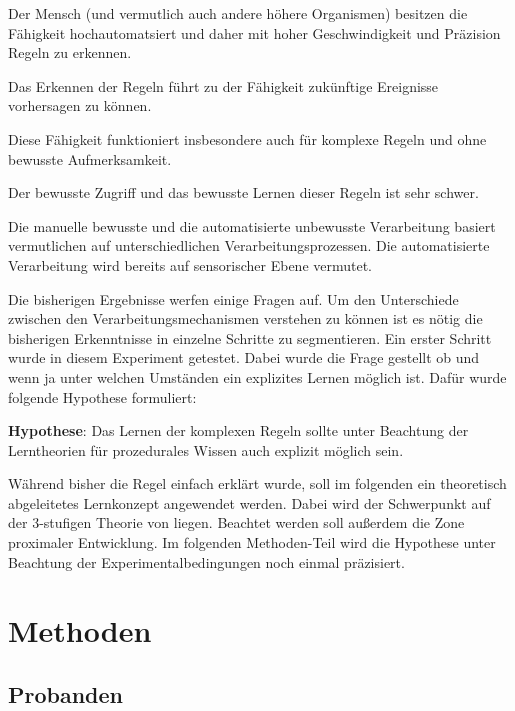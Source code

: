 \documentclass[doc,a4paper,12pt]{apa6}
\begin{document}
\begin{compactitem}
\item Der Mensch (und vermutlich auch andere höhere Organismen) besitzen die Fähigkeit hochautomatsiert und daher mit hoher Geschwindigkeit und Präzision Regeln zu erkennen.
\item Das Erkennen der Regeln führt zu der Fähigkeit zukünftige Ereignisse vorhersagen zu können.
\item Diese Fähigkeit funktioniert insbesondere auch für komplexe Regeln und ohne bewusste Aufmerksamkeit.
\item Der bewusste Zugriff und das bewusste Lernen dieser Regeln ist sehr schwer.
\item Die manuelle bewusste und die automatisierte unbewusste Verarbeitung basiert vermutlichen auf unterschiedlichen Verarbeitungsprozessen. Die automatisierte Verarbeitung wird bereits auf sensorischer Ebene vermutet.
\end{compactitem}

Die bisherigen Ergebnisse werfen einige Fragen auf. Um den Unterschiede zwischen den Verarbeitungsmechanismen verstehen zu können ist es nötig die bisherigen Erkenntnisse in einzelne Schritte zu segmentieren. Ein erster Schritt wurde in diesem Experiment getestet. Dabei wurde die Frage gestellt ob und wenn ja unter welchen Umständen ein explizites Lernen möglich ist. Dafür wurde folgende Hypothese formuliert:

\textbf{Hypothese}: Das Lernen der komplexen Regeln sollte unter Beachtung der Lerntheorien für prozedurales Wissen auch explizit möglich sein.

Während bisher die Regel einfach erklärt wurde, soll im folgenden ein theoretisch abgeleitetes Lernkonzept angewendet werden. Dabei wird der Schwerpunkt auf der 3-stufigen Theorie von \textcite{fitts1967human} liegen. Beachtet werden soll außerdem die Zone proximaler Entwicklung. Im folgenden Methoden-Teil wird die Hypothese unter Beachtung der Experimentalbedingungen noch einmal präzisiert.


\section{Methoden}

\subsection{Probanden}
\end{document}
